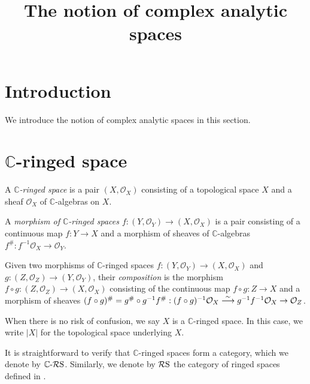 








\title{The notion of complex analytic spaces}





\maketitle


\tableofcontents



\section{Introduction}
We introduce the notion of complex analytic spaces in this section.

\section{\texorpdfstring{$\mathbb{C}$}{C}-ringed space}

\begin{definition}
    A \emph{$\mathbb{C}$-ringed space} is a pair $(X,\mathcal{O}_X)$ consisting of a topological space $X$ and a sheaf $\mathcal{O}_X$ of $\mathbb{C}$-algebras on $X$.

    A \emph{morphism of $\mathbb{C}$-ringed spaces $f:(Y,\mathcal{O}_Y)\rightarrow (X,\mathcal{O}_X)$} is a pair consisting of a continuous map $f:Y\rightarrow X$ and a morphism of sheaves of $\mathbb{C}$-algebras $f^{\#}:f^{-1}\mathcal{O}_X\rightarrow \mathcal{O}_Y$.

    Given two morphisms of $\mathbb{C}$-ringed spaces $f:(Y,\mathcal{O}_Y)\rightarrow (X,\mathcal{O}_X)$ and $g:(Z,\mathcal{O}_Z)\rightarrow (Y,\mathcal{O}_Y)$, their \emph{composition} is the morphism $f\circ g:(Z,\mathcal{O}_Z)\rightarrow (X,\mathcal{O}_X)$ consisting of the continuous map $f\circ g:Z\rightarrow X$ and a morphism of sheaves $(f\circ g)^{\#}=g^{\#}\circ g^{-1}f^{\#}:(f\circ g)^{-1}\mathcal{O}_X\stackrel{\sim}{\longrightarrow} g^{-1}f^{-1}\mathcal{O}_X\rightarrow \mathcal{O}_Z$.

    When there is no risk of confusion, we say $X$ is a $\mathbb{C}$-ringed space. In this case, we write $|X|$ for the topological space underlying $X$.
\end{definition}
It is straightforward to verify that $\mathbb{C}$-ringed spaces form a category, which we denote by $\mathbb{C}\text{-}\mathcal{R}\mathrm{S}$.
Similarly, we denote by $\mathcal{R}\mathrm{S}$ the category of ringed spaces defined in \cite[\href{https://stacks.math.columbia.edu/tag/0090}{Tag 0090}]{stacks-project}.

